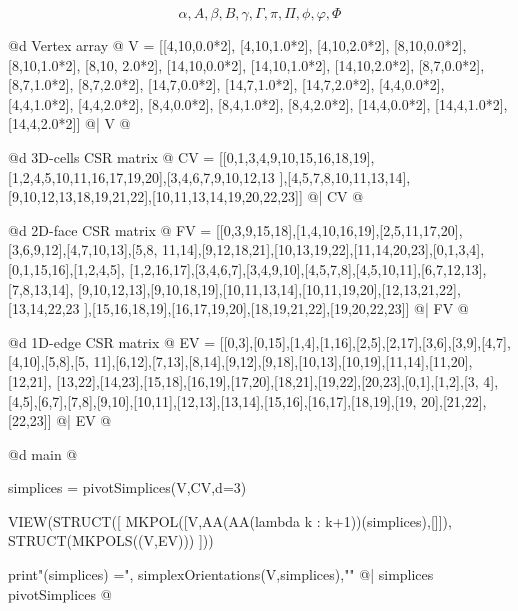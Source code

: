 \documentclass[11pt,oneside]{article}	%
\begin{document}
\[
\alpha, A, \beta, B, \gamma, \Gamma, \pi, \Pi, \phi, \varphi, \Phi
\]

@d Vertex array
@{
V = [[4,10,0.0*2], [4,10,1.0*2], [4,10,2.0*2], [8,10,0.0*2], [8,10,1.0*2], [8,10,
2.0*2], [14,10,0.0*2], [14,10,1.0*2], [14,10,2.0*2], [8,7,0.0*2], [8,7,1.0*2], 
[8,7,2.0*2], [14,7,0.0*2], [14,7,1.0*2], [14,7,2.0*2], [4,4,0.0*2], [4,4,1.0*2], 
[4,4,2.0*2], [8,4,0.0*2], [8,4,1.0*2], [8,4,2.0*2], [14,4,0.0*2], [14,4,1.0*2], 
[14,4,2.0*2]] 
@|  V @}

@d 3D-cells CSR matrix
@{
CV = [[0,1,3,4,9,10,15,16,18,19],[1,2,4,5,10,11,16,17,19,20],[3,4,6,7,9,10,12,13
],[4,5,7,8,10,11,13,14],[9,10,12,13,18,19,21,22],[10,11,13,14,19,20,22,23]]
@|  CV @}


@d 2D-face CSR matrix
@{
FV = [[0,3,9,15,18],[1,4,10,16,19],[2,5,11,17,20],[3,6,9,12],[4,7,10,13],[5,8,
11,14],[9,12,18,21],[10,13,19,22],[11,14,20,23],[0,1,3,4],[0,1,15,16],[1,2,4,5],
[1,2,16,17],[3,4,6,7],[3,4,9,10],[4,5,7,8],[4,5,10,11],[6,7,12,13],[7,8,13,14],
[9,10,12,13],[9,10,18,19],[10,11,13,14],[10,11,19,20],[12,13,21,22],[13,14,22,23
],[15,16,18,19],[16,17,19,20],[18,19,21,22],[19,20,22,23]]
@|  FV @}

@d 1D-edge CSR matrix
@{
EV = [[0,3],[0,15],[1,4],[1,16],[2,5],[2,17],[3,6],[3,9],[4,7],[4,10],[5,8],[5,
11],[6,12],[7,13],[8,14],[9,12],[9,18],[10,13],[10,19],[11,14],[11,20],[12,21],
[13,22],[14,23],[15,18],[16,19],[17,20],[18,21],[19,22],[20,23],[0,1],[1,2],[3,
4],[4,5],[6,7],[7,8],[9,10],[10,11],[12,13],[13,14],[15,16],[16,17],[18,19],[19,
20],[21,22],[22,23]]
@|  EV @}


@d main
@{
simplices = pivotSimplices(V,CV,d=3)

VIEW(STRUCT([
			MKPOL([V,AA(AA(lambda k : k+1))(simplices),[]]),
			STRUCT(MKPOLS((V,EV)))
			]))

print"\nsimplexOrientations(simplices) =", simplexOrientations(V,simplices),"\n"
@|  simplices pivotSimplices @}
\end{document}
